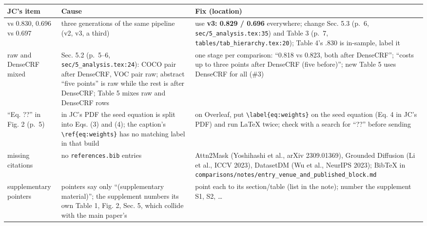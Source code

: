 \documentclass[
  10pt,
]{article}
\newcounter{none} %
\begin{document}
{\def\LTcaptype{none} %
\begin{longtable}[]{@{}
  >{\raggedright\arraybackslash}p{}
  >{\raggedright\arraybackslash}p{}
  >{\raggedright\arraybackslash}p{}@{}}
\toprule\noalign{}
\begin{minipage}[b]{\linewidth}\raggedright
JC's item
\end{minipage} & \begin{minipage}[b]{\linewidth}\raggedright
Cause
\end{minipage} & \begin{minipage}[b]{\linewidth}\raggedright
Fix (location)
\end{minipage} \\
\midrule\noalign{}
\endhead
\bottomrule\noalign{}
\endlastfoot
0.829 vs 0.830, 0.696 vs 0.697 & three generations of the same pipeline
(v2, v3, a third) & use \textbf{v3: 0.829 / 0.696} everywhere; change
Sec. 5.3 (p.~6, \texttt{sec/5\_analysis.tex:35}) and Table 3 (p.~7,
\texttt{tables/tab\_hierarchy.tex:20}); Table 4's .830 is in-sample,
label it \\
raw and DenseCRF mixed & Sec. 5.2 (p.~5--6,
\texttt{sec/5\_analysis.tex:24}): COCO pair after DenseCRF, VOC pair
raw; abstract ``five points'' is raw while the rest is after DenseCRF;
Table 5 mixes raw and DenseCRF rows & one stage per comparison: ``0.818
vs 0.823, both after DenseCRF''; ``costs up to three points after
DenseCRF (five before)''; new Table 5 uses DenseCRF for all (\#3) \\
``Eq. ??'' in Fig. 2 (p.~5) & in JC's PDF the seed equation is split
into Eqs. (3) and (4); the caption's
\texttt{\textbackslash{}ref\{eq:weights\}} has no matching label in that
build & on Overleaf, put \texttt{\textbackslash{}label\{eq:weights\}} on
the seed equation (Eq. 4 in JC's PDF) and run LaTeX twice; check with a
search for ``??'' before sending \\
missing citations & no \texttt{references.bib} entries & Attn2Mask
(Yoshihashi et al., arXiv 2309.01369), Grounded Diffusion (Li et al.,
ICCV 2023), DatasetDM (Wu et al., NeurIPS 2023); BibTeX in
\texttt{comparisons/notes/entry\_venue\_and\_published\_block.md} \\
supplementary pointers & 10 pointers say only ``(supplementary
material)''; the supplement numbers its own Table 1, Fig. 2, Sec. 5,
which collide with the main paper's & point each to its section/table
(list in the note); number the supplement S1, S2, \ldots{} \\
\end{longtable}
}
\end{document}
